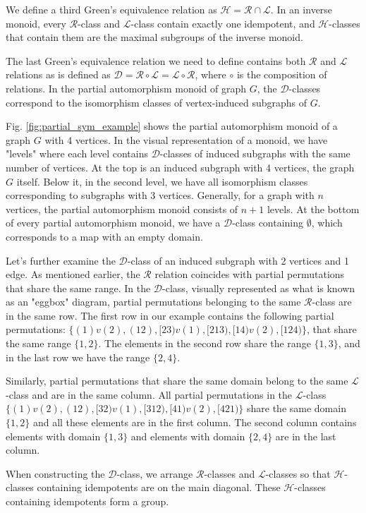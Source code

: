 We define a third Green's equivalence relation as $\mathcal{H} = \mathcal{R} \cap \mathcal{L}$. In an inverse monoid, every $\mathcal{R}$-class and $\mathcal{L}$-class contain exactly one idempotent, and $\mathcal{H}$-classes that contain them are the maximal subgroups of the inverse monoid.

The last Green's equivalence relation we need to define contains both $\mathcal{R}$ and $\mathcal{L}$ relations as is defined as $\mathcal{D} = \mathcal{R} \circ \mathcal{L} = \mathcal{L} \circ \mathcal{R}$, where $\circ$ is the composition of relations. In the partial automorphism monoid of graph $G$, the $\mathcal{D}$-classes correspond to the isomorphism classes of vertex-induced subgraphs of $G$.

Fig. \ref{fig:partial_sym_example} shows the partial automorphism monoid of a graph $G$ with 4 vertices. In the visual representation of a monoid, we have "levels" where each level contains $\mathcal{D}$-classes of induced subgraphs with the same number of vertices. At the top is an induced subgraph with 4 vertices, the graph $G$ itself. Below it, in the second level, we have all isomorphism classes corresponding to subgraphs with 3 vertices. Generally, for a graph with $n$ vertices, the partial automorphism monoid consists of $n+1$ levels. At the bottom of every partial automorphism monoid, we have a $\mathcal{D}$-class containing $\emptyset$, which corresponds to a map with an empty domain.

Let's further examine the $\mathcal{D}$-class of an induced subgraph with 2 vertices and 1 edge. As mentioned earlier, the $\mathcal{R}$ relation coincides with partial permutations that share the same range. In the $\mathcal{D}$-class, visually represented as what is known as an "eggbox" diagram, partial permutations belonging to the same $\mathcal{R}$-class are in the same row. The first row in our example contains the following partial permutations: $\{ (1)v(2), (12), [23)v(1), [213), [14)v(2), [124) \}$, that share the same range $\{1, 2\}$. The elements in the second row share the range $\{ 1, 3\}$, and in the last row we have the range $\{ 2, 4 \}$.

Similarly, partial permutations that share the same domain belong to the same $\mathcal{L}$-class and are in the same column. All partial permutations in the $\mathcal{L}$-class $\{ (1)v(2), (12), [32)v(1), [312), [41)v(2), [421) \}$ share the same domain $\{ 1, 2\}$ and all these elements are in the first column. The second column contains elements with domain $\{ 1, 3 \}$ and elements with domain $\{ 2, 4 \}$ are in the last column.

When constructing the $\mathcal{D}$-class, we arrange $\mathcal{R}$-classes and $\mathcal{L}$-classes so that $\mathcal{H}$-classes containing idempotents are on the main diagonal. These $\mathcal{H}$-classes containing idempotents form a group.